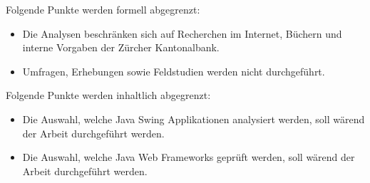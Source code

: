 Folgende Punkte werden formell abgegrenzt:

\begin{itemize}
  \item Die Analysen beschränken sich auf Recherchen im Internet, Büchern und
  interne Vorgaben der Zürcher Kantonalbank.
  \item Umfragen, Erhebungen sowie Feldstudien werden nicht durchgeführt.
\end{itemize}

\noindent  
Folgende Punkte werden inhaltlich abgegrenzt:
	
\begin{itemize}
  \item Die Auswahl, welche Java Swing Applikationen analysiert werden, soll
  wärend der Arbeit durchgeführt werden.
  \item Die Auswahl, welche Java Web Frameworks geprüft werden, soll wärend  der
  Arbeit durchgeführt werden.
\end{itemize}